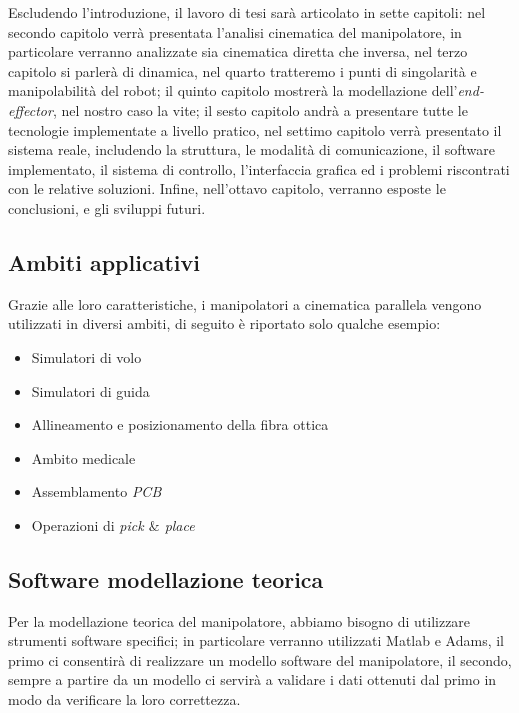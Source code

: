 Escludendo l'introduzione, il lavoro di tesi sarà articolato in sette capitoli: nel secondo capitolo verrà presentata l'analisi cinematica del manipolatore, in particolare verranno analizzate sia cinematica diretta che inversa, nel terzo capitolo si parlerà di dinamica, nel quarto tratteremo i punti di singolarità e manipolabilità del robot; il quinto capitolo mostrerà la modellazione dell'\textit{end-effector}, nel nostro caso la vite; il sesto capitolo andrà a presentare tutte le tecnologie implementate a livello pratico, nel settimo capitolo verrà presentato il sistema reale, includendo la struttura, le modalità di comunicazione, il software implementato, il sistema di controllo, l'interfaccia grafica ed i problemi riscontrati con le relative soluzioni. Infine, nell'ottavo capitolo, verranno esposte le conclusioni, e gli sviluppi futuri.
\subsection{Ambiti applicativi}
Grazie alle loro caratteristiche, i manipolatori a cinematica parallela vengono utilizzati in diversi ambiti, di seguito è riportato solo qualche esempio:
\begin{itemize}
	\item Simulatori di volo
	\item Simulatori di guida
	\item Allineamento e posizionamento della fibra ottica
	\item Ambito medicale
	\item Assemblamento \textit{PCB}
	\item Operazioni di \textit{pick $\&$ place}
\end{itemize}

\subsection{Software modellazione teorica}
Per la modellazione teorica del manipolatore, abbiamo bisogno di utilizzare strumenti software specifici; in particolare verranno utilizzati Matlab e Adams, il primo ci consentirà di realizzare un modello software del manipolatore, il secondo, sempre a partire da un modello ci servirà a validare i dati ottenuti dal primo in modo da verificare la loro correttezza.
